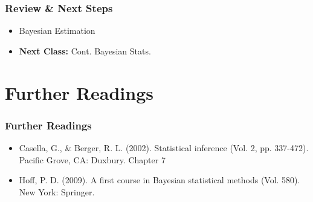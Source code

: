 \documentclass[
  shownotes,
  xcolor={svgnames},
  hyperref={colorlinks,citecolor=DarkBlue,linkcolor=DarkRed,urlcolor=DarkBlue}
  , aspectratio=169]{beamer}
\begin{document}
\begin{frame}
\frametitle{Review \& Next Steps}
  
  \begin{itemize} 
    
    
    \item Bayesian Estimation
  \bigskip  

  
  \item  {\bf Next Class:} Cont. Bayesian Stats.
  
  
  \end{itemize}


\end{frame}



\section{Further Readings}
\begin{frame}
\frametitle{Further Readings}

\begin{itemize}
  \item Casella, G., \& Berger, R. L. (2002). Statistical inference (Vol. 2, pp. 337-472). Pacific Grove, CA: Duxbury. Chapter 7
  \medskip
  \item Hoff, P. D. (2009). A first course in Bayesian statistical methods (Vol. 580). New York: Springer.
  \medskip
  
  
  
\end{itemize}

\end{frame}

\end{document}
